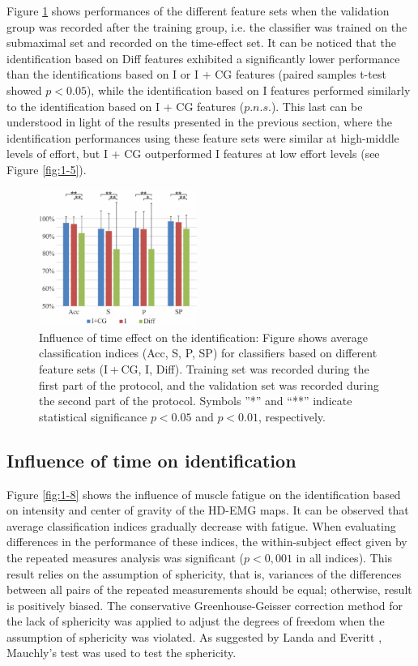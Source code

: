 Figure \ref{fig:1-7} shows performances of the different feature sets when the validation group was recorded after the training group, i.e. the classifier was trained on the submaximal set and recorded on the time-effect set. It can be noticed that the identification based on Diff features exhibited a significantly lower performance than the identifications based on I or I + CG features (paired samples t-test showed $p < 0.05$), while the identification based on I features performed similarly to the identification based on I + CG features ($p.n.s.$). This last can be understood in light of the results presented in the previous section, where the identification performances using these feature sets were similar at high-middle levels of effort, but I + CG outperformed I features at low effort levels (see Figure \ref{fig:1-5}).

\begin{figure}[ht]
\centering
\includegraphics[width=0.459\textwidth]{Images/figure1_7.png}
\caption{Influence of time effect on the identification: Figure shows average classification indices (Acc, S, P, SP) for classifiers based on different feature sets (I + CG, I, Diff). Training set was recorded during the first part of the protocol, and the validation set was recorded during the second part of the protocol. Symbols ”*” and “**” indicate statistical significance $p < 0.05$ and $p < 0.01$, respectively.}
\label{fig:1-7}
\end{figure}      

\subsection{Influence of time on identification}
Figure \ref{fig:1-8} shows the influence of muscle fatigue on the identification based on intensity and center of gravity of the HD-EMG maps. It can be observed that average classification indices gradually decrease with fatigue. When evaluating differences in the performance of these indices, the within-subject effect given by the repeated measures analysis was significant ($p < 0,001$ in all indices). This result relies on the assumption of sphericity, that is, variances of the differences between all pairs of the repeated measurements should be equal; otherwise, result is positively biased. The conservative Greenhouse-Geisser correction method for the lack of sphericity \citep{Greenhouse1959} was applied to adjust the degrees of freedom \citep{Landa2004, Loftus1994} when the assumption of sphericity was violated. As suggested by Landa and Everitt \citep{Landa2004}, Mauchly’s test was used to test the sphericity.

